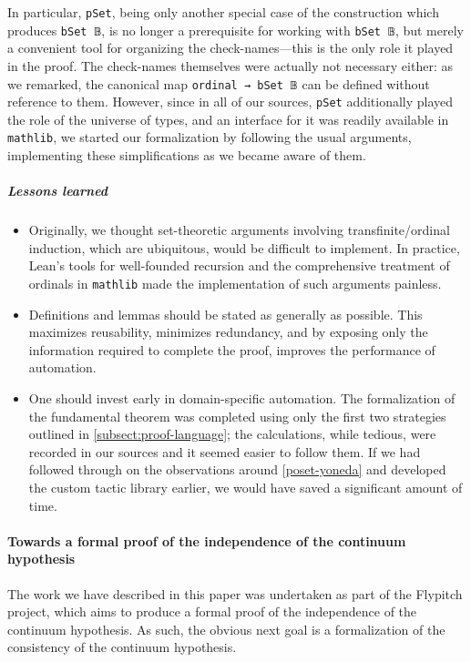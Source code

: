 \documentclass[a4paper,USenglish,cleveref, autoref]{lipics-v2019}
\newcommand{\lil}{\lstinline}
\theoremstyle{theorem}
\theoremstyle{definition}
\begin{document}
In particular, \lstinline{pSet}, being only another special case of the construction which produces \lstinline{bSet 𝔹}, is no longer a prerequisite for working with \lstinline{bSet 𝔹}, but merely a convenient tool for organizing the check-names---this is the only role it played in the proof. The check-names themselves were actually not necessary either: as we remarked, the canonical map \lil{ordinal → bSet 𝔹} can be defined without reference to them. However, since in all of our sources, \lstinline{pSet} additionally played the role of the universe of types, and an interface for it was readily available in \lstinline{mathlib}, we started our formalization by following the usual arguments, implementing these simplifications as we became aware of them.
\subparagraph*{Lessons learned}
\begin{itemize}
\item Originally, we thought set-theoretic arguments involving transfinite/ordinal induction, which are ubiquitous, would be difficult to implement. In practice, Lean's tools for well-founded recursion and the comprehensive treatment of ordinals in \lstinline{mathlib} made the implementation of such arguments painless.
\item Definitions and lemmas should be stated as generally as possible. This maximizes reusability, minimizes redundancy, and by exposing only the information required to complete the proof, improves the performance of automation.

\item One should invest early in domain-specific automation. The formalization of the fundamental theorem was completed using only the first two strategies outlined in \autoref{subsect:proof-language}; the calculations, while tedious, were recorded in our sources and it seemed easier to follow them. If we had followed through on the observations around \autoref{poset-yoneda} and developed the custom tactic library earlier, we would have saved a significant amount of time.
\end{itemize}

\paragraph*{Towards a formal proof of the independence of the continuum hypothesis}

The work we have described in this paper was undertaken as part of the Flypitch project, which aims to produce a formal proof of the independence of the continuum hypothesis. As such, the obvious next goal is a formalization of the consistency of the continuum hypothesis.
\end{document}
